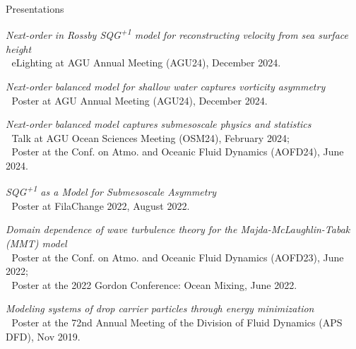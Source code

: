 \documentclass{resume} %
\begin{document}

\begin{rSection}{Presentations}
\begin{etaremune}
    \item \textit{Next-order in Rossby SQG\textsuperscript{+1} model for reconstructing velocity from sea surface height}\\
        $\left.\;\right.$ eLighting at AGU Annual Meeting (AGU24), \hfill December 2024.
    \item \textit{Next-order balanced model for shallow water captures vorticity asymmetry}\\
        $\left.\;\right.$ Poster at AGU Annual Meeting (AGU24), \hfill December 2024.
    \item \textit{Next-order balanced model captures submesoscale physics and statistics}\\
        $\left.\;\right.$ Talk at AGU Ocean Sciences Meeting (OSM24), \hfill February 2024;\\
        $\left.\;\right.$ Poster at the Conf. on Atmo. and Oceanic Fluid Dynamics (AOFD24), \hfill June 2024.
    \item \textit{SQG\textsuperscript{+1} as a Model for Submesoscale Asymmetry}\\
        $\left.\;\right.$ Poster at FilaChange 2022, \hfill August 2022.
    \item \textit{Domain dependence of wave turbulence theory for the Majda-McLaughlin-Tabak (MMT) model}\\
        $\left.\;\right.$ Poster at the Conf. on Atmo. and Oceanic Fluid Dynamics (AOFD23), \hfill June 2022;\\
        $\left.\;\right.$ Poster at the 2022 Gordon Conference: Ocean Mixing, \hfill June 2022.
    \item \textit{Modeling systems of drop carrier particles through energy minimization} \\
        $\left.\;\right.$ Poster at the 72nd Annual Meeting of the Division of Fluid Dynamics (APS DFD), \hfill Nov 2019.
\end{etaremune}
\end{rSection}


\end{document}
